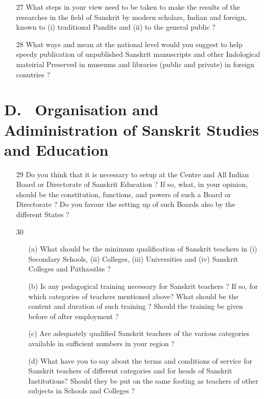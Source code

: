 {\rm 
\begin{itemize}
\item[27] What steps in your view need to be taken to make the results of the researches in the field of Sanskrit by modern scholars, Indian and foreign, known to (i) traditional Pandits and (ii) to the general public ?

\item[28] What ways and mean at the national level would you suggest to help speedy publication of unpublished Sanskrit manuscripts and other Indological mateirial Preserved in museums and libraries (public and private) in foreign conutries ?
\end{itemize}
}

\section*{{\rm D.~ Organisation and Adiministration of Sanskrit Studies and Education}}

{\rm 
\begin{itemize}

\item[29] Do you think that it is necessary to setup at the Centre and All Indian Board or Directorate of Sanskrit Education ? If so, what, in your opinion, should be the constitution, functions, and powers of such a Board or Directorate ? Do you favour the setting up of such Boards also by the different States ?

\item[30] \begin{itemize}
           
           \item[(a)] What should be the minimum qualification of Sanskrit teachers in (i) Secondary Schools, (ii) Colleges, (iii) Universities and (iv) Sanskrit Colleges and P$\bar{a}$tha$\acute{s}\bar{a}$l$\bar{a}$s ?
           
           \item[(b)] Is any pedagogical training necessary for Sanskrit teachers ? If so, for which categories of teachers mentioned above? What should be the content and duration of such training ? Should the training be given before of after employment ?
           
           \item[(c)] Are adequately qualified Sanskrit teachers of the various categories available in sufficient numbers in your region ?
           
           \item[(d)] What have you to say about the terms and conditions of service for Sanskrit teachers of different categories and for heads of Sanskrit Institutions? Should they be put on the same footing as teachers of other subjects in Schools and Colleges ?
          \end{itemize}
\end{itemize}
}

